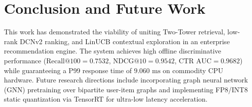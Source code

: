 \documentclass[conference]{IEEEtran}
\begin{document}
\section{Conclusion and Future Work}
This work has demonstrated the viability of uniting Two-Tower retrieval, low-rank DCNv2 ranking, and LinUCB contextual exploration in an enterprise recommendation engine. The system achieves high offline discriminative performance ($\text{Recall@100}=0.7532$, $\text{NDCG@10}=0.9542$, $\text{CTR AUC}=0.9682$) while guaranteeing a P99 response time of $9.060\text{ ms}$ on commodity CPU hardware. Future research directions include incorporating graph neural network (GNN) pretraining over bipartite user-item graphs \cite{he2020lightgcn} and implementing FP8/INT8 static quantization via TensorRT for ultra-low latency acceleration.



\end{document}
